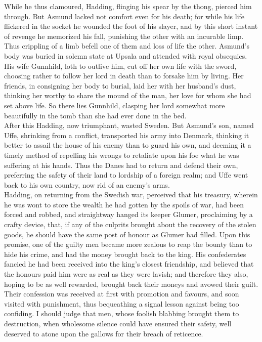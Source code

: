 \documentclass[10pt,a4paper]{report}
\begin{document}
While he thus clamoured, Hadding, flinging his spear by the thong, pierced him through. But Asmund lacked not comfort even for his death; for while his life flickered in the socket he wounded the foot of his slayer, and by this short instant of revenge he memorized his fall, punishing the other with an incurable limp. Thus crippling of a limb befell one of them and loss of life the other. Asmund's body was buried in solemn state at Upsala and attended with royal obsequies. His wife Gunnhild, loth to outlive him, cut off her own life with the sword, choosing rather to follow her lord in death than to forsake him by living. Her friends, in consigning her body to burial, laid her with her husband's dust, thinking her worthy to share the mound of the man, her love for whom she had set above life. So there lies Gunnhild, clasping her lord somewhat more beautifully in the tomb than she had ever done in the bed.\\

After this Hadding, now triumphant, wasted Sweden. But Asmund's son, named Uffe, shrinking from a conflict, transported his army into Denmark, thinking it better to assail the house of his enemy than to guard his own, and deeming it a timely method of repelling his wrongs to retaliate upon his foe what he was suffering at his hands. Thus the Danes had to return and defend their own, preferring the safety of their land to lordship of a foreign realm; and Uffe went back to his own country, now rid of an enemy's arms.\\

Hadding, on returning from the Swedish war, perceived that his treasury, wherein he was wont to store the wealth he had gotten by the spoils of war, had been forced and robbed, and straightway hanged its keeper Glumer, proclaiming by a crafty device, that, if any of the culprits brought about the recovery of the stolen goods, he should have the same post of honour as Glumer had filled. Upon this promise, one of the guilty men became more zealous to reap the bounty than to hide his crime, and had the money brought back to the king. His confederates fancied he had been received into the king's closest friendship, and believed that the honours paid him were as real as they were lavish; and therefore they also, hoping to be as well rewarded, brought back their moneys and avowed their guilt. Their confession was received at first with promotion and favours, and soon visited with punishment, thus bequeathing a signal lesson against being too confiding. I should judge that men, whose foolish blabbing brought them to destruction, when wholesome silence could have ensured their safety, well deserved to atone upon the gallows for their breach of reticence.\\
\end{document}
